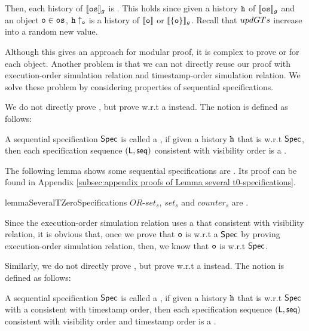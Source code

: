 Then, each history of $\llbracket \mathtt{os} \rrbracket_g$ is \crdtlinearizable{}. This holds since given a history $\mathtt{h}$ of $\llbracket \mathtt{os} \rrbracket_g$ and an object $\mathtt{o} \in \mathtt{os}$, $\mathtt{h} \uparrow_{\mathtt{o}}$ is a history of $\llbracket \mathtt{o} \rrbracket$ or $\llbracket \{ \mathtt{o} \} \rrbracket_g$. Recall that $updGTs$ increase into a random new value.

Although this gives an approach for modular proof, it is complex to prove \tzerolin{} or \tonelin{} for each object. Another problem is that we can not directly reuse our proof with execution-order simulation relation and timestamp-order simulation relation. We solve these problem by considering properties of sequential specifications.

We do not directly prove \tzerolin{}, but prove \crdtlinearizable{} w.r.t a \tzerospec{} instead. The notion \tzerospec{} is defined as follows:

\begin{definition}[\tzerospec{}]
\label{definition:t0-specification}
A sequential specification $\mathsf{Spec}$ is called a \tzerospec{}, if given a history $\mathtt{h}$ that is \crdtlinearizable{} w.r.t $\mathsf{Spec}$, then each specification sequence $(\mathsf{L}, \mathsf{seq})$ consistent with visibility order is a \crdtlinearization{}.
\end{definition}

The following lemma shows some sequential specifications are \tzerospec{}. Its proof can be found in Appendix \ref{subsec:appendix proofs of Lemma several t0-specifications}.

\begin{restatable}{lemma}{SeveralTZeroSpecifications}
\label{lemma:several t0-specifications}
$\mathit{OR}$-$\mathit{set}_s$, $\mathit{set}_s$ and $\mathit{counter}_s$ are \tzerospec{}.
\end{restatable}

Since the execution-order simulation relation uses a \crdtlinearization that consistent with visibility relation, it is obvious that, once we prove that $\mathtt{o}$ is \crdtlinearizable{} w.r.t a \tzerospec{} $\mathsf{Spec}$ by proving execution-order simulation relation, then, we know that $\mathtt{o}$ is \tzerolinearizable w.r.t $\mathsf{Spec}$.

Similarly, we do not directly prove \tonelin{}, but prove \crdtlinearizable{} w.r.t a \tonespec{} instead. The notion \tonespec{} is defined as follows:

\begin{definition}[\tonespec{}]
\label{definition:t1-specification}
A sequential specification $\mathsf{Spec}$ is called a \tonespec{}, if given a history $\mathtt{h}$ that is \crdtlinearizable{} w.r.t $\mathsf{Spec}$ with a \crdtlinearization{} consistent with timestamp order, then each specification sequence $(\mathsf{L}, \mathsf{seq})$ consistent with visibility order and timestamp order is a \crdtlinearization{}.
\end{definition}

